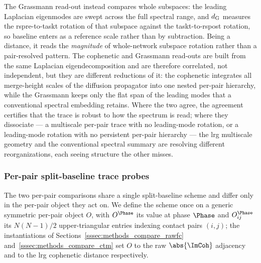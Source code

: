 %
The Grassmann read-out instead compares whole subspaces: the leading Laplacian eigenmodes are swept across the full spectral range, and \(d_{\rm G}\) measures the \acrshort{rspre}-to-\acrshort{taskt} rotation of that subspace against the \acrshort{taskt}-to-\acrshort{rspost} rotation, so baseline enters as a reference scale rather than by subtraction. Being a distance, it reads the \emph{magnitude} of whole-network subspace rotation rather than a pair-resolved pattern. The cophenetic and Grassmann read-outs are built from the same Laplacian eigendecomposition and are therefore correlated, not independent, but they are different reductions of it: the cophenetic integrates all merge-height scales of the diffusion propagator into one nested per-pair hierarchy, while the Grassmann keeps only the flat span of the leading modes that a conventional spectral embedding retains. Where the two agree, the agreement certifies that the trace is robust to how the spectrum is read; where they dissociate --- a multiscale per-pair trace with no leading-mode rotation, or a leading-mode rotation with no persistent per-pair hierarchy --- the \gls{lrg} multiscale geometry and the conventional spectral summary are resolving different reorganizations, each seeing structure the other misses.
%
\subsubsection{Per-pair split-baseline trace probes}
    \label{sssec:methods_compare_perpair}
%
The two per-pair comparisons share a single split-baseline scheme and differ only in the per-pair object they act on. We define the scheme once on a generic symmetric per-pair object \(O\), with \(O^{\Phase}\) its value at phase \(\Phase\) and \(O^{\Phase}_{ij}\) its \(N(N-1)/2\) upper-triangular entries indexing contact pairs \((i,j)\); the instantiations of Sections~\ref{sssec:methods_compare_rawfc} and~\ref{sssec:methods_compare_ctm} set \(O\) to the raw \(\abs{\ImCoh}\) adjacency and to the \gls{lrg} cophenetic distance respectively.

